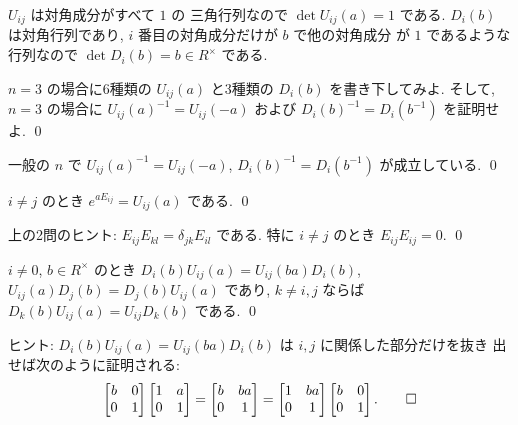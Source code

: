 \documentclass[12pt,twoside]{jarticle}
\begin{document}
$U_{ij}$ は対角成分がすべて $1$ の
三角行列なので $\det U_{ij}(a)=1$ である.
$D_i(b)$ は対角行列であり, $i$ 番目の対角成分だけが $b$ で他の対角成分
が $1$ であるような行列なので $\det D_i(b)=b\in R^\times$ である.

\begin{question}
  $n=3$ の場合に6種類の $U_{ij}(a)$ と3種類の $D_i(b)$ を書き下してみよ.
  そして, $n=3$ の場合に $U_{ij}(a)^{-1}=U_{ij}(-a)$ 
  および $D_i(b)^{-1}=D_i(b^{-1})$ を証明せよ.
  \qed
\end{question}

\begin{question}
  一般の $n$ で $U_{ij}(a)^{-1}=U_{ij}(-a)$, $D_i(b)^{-1}=D_i(b^{-1})$ 
  が成立している. 
  \qed
\end{question}

\begin{question}
  $i\ne j$ のとき $e^{aE_{ij}} = U_{ij}(a)$ である.
  \qed
\end{question}

\noindent
上の2問のヒント: $E_{ij}E_{kl}=\delta_{jk}E_{il}$ である. 
特に $i\ne j$ のとき $E_{ij}E_{ij}=0$.
\qed

\begin{question}
\label{q:DU-UD}
  $i\ne 0$, $b\in R^\times$ のとき %
  $D_i(b)U_{ij}(a)=U_{ij}(ba)D_i(b)$, $U_{ij}(a)D_j(b)=D_j(b)U_{ij}(a)$ 
  であり, $k\ne i,j$ ならば $D_k(b)U_{ij}(a)=U_{ij}D_k(b)$ である.
  \qed
\end{question}

\noindent
ヒント: $D_i(b)U_{ij}(a)=U_{ij}(ba)D_i(b)$ は $i,j$ に関係した部分だけを抜き
出せば次のように証明される:
\begin{equation*}
  \begin{bmatrix}
    b & 0 \\
    0 & 1 \\
  \end{bmatrix}
  \begin{bmatrix}
    1 & a \\
    0 & 1 \\
  \end{bmatrix}
  =
  \begin{bmatrix}
    b & ba \\
    0 & 1 \\
  \end{bmatrix}
  =
  \begin{bmatrix}
    1 & ba \\
    0 & 1 \\
  \end{bmatrix}
  \begin{bmatrix}
    b & 0 \\
    0 & 1 \\
  \end{bmatrix}.
  \qed
\end{equation*}
\end{document}
